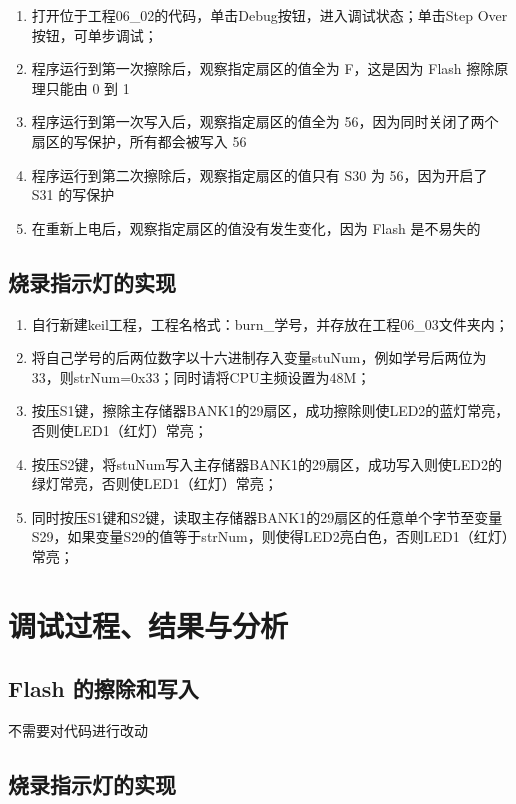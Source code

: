 \documentclass[a4paper,10pt,UTF8]{paper}
\numberwithin{equation}{section}
\numberwithin{figure}{section}
\begin{document}
\begin{enumerate}
  \item 打开位于工程06\_02的代码，单击Debug按钮，进入调试状态；单击Step Over按钮，可单步调试；
  \item 程序运行到第一次擦除后，观察指定扇区的值全为 F，这是因为 Flash 擦除原理只能由 0 到 1
  \item 程序运行到第一次写入后，观察指定扇区的值全为 56，因为同时关闭了两个扇区的写保护，所有都会被写入 56
  \item 程序运行到第二次擦除后，观察指定扇区的值只有 S30 为 56，因为开启了 S31 的写保护
  \item 在重新上电后，观察指定扇区的值没有发生变化，因为 Flash 是不易失的
\end{enumerate}

\subsection{烧录指示灯的实现}

\begin{enumerate}
  \item 自行新建keil工程，工程名格式：burn\_学号，并存放在工程06\_03文件夹内；
  \item 将自己学号的后两位数字以十六进制存入变量stuNum，例如学号后两位为33，则strNum=0x33；同时请将CPU主频设置为48M； 
  \item 按压S1键，擦除主存储器BANK1的29扇区，成功擦除则使LED2的蓝灯常亮，否则使LED1（红灯）常亮；
  \item 按压S2键，将stuNum写入主存储器BANK1的29扇区，成功写入则使LED2的绿灯常亮，否则使LED1（红灯）常亮；
  \item 同时按压S1键和S2键，读取主存储器BANK1的29扇区的任意单个字节至变量S29，如果变量S29的值等于strNum，则使得LED2亮白色，否则LED1（红灯）常亮；
\end{enumerate}

\section{调试过程、结果与分析}

\subsection{Flash 的擦除和写入}

不需要对代码进行改动

\subsection{烧录指示灯的实现}
\end{document}
